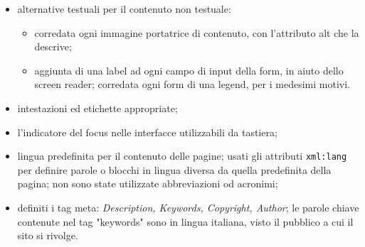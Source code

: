 {{\begin{itemize}
\begin{itemize}
\begin{itemize}
					\item Inseriti elementi \textit{th} per le intestazioni e riservati \textit{td} per i soli dati.
					\item Utilizzato l'attributo \textbf{scope} per rendere esplicita la relazione tra le celle d'intestazione e le celle di dati: indicando l’estensione di celle per cui l’intestazione si trova nella cella marcata con l’attributo \textbf{scope}. \\
					Abbiamo marcanto \textbf{scope} con il valore \textit{col} le celle d'intestazione, assicurando che le informazioni di intestazione si applichino a tutte le celle della colonna; col valore \textit{colspan}, invece, le celle d'intestazione relative ad un gruppo di colonne.
					\item Utilizzato serie di \textbf{id} e di \textbf{headers}: il primo per identificare una cella che contiene informazioni di intestazione a cui fare riferimento con headers serve per risalire alle celle d’intestazione da porre in relazione con la cella corrente. \\
					Questo per aumentare la comprensione dei contenuti, diminuire il disorientamento ed agevolare l'utente che fa uso di screen reader, visto che questi ultimi che tengono traccia delle intestazioni.
				\end{itemize}
			\item alternative testuali per il contenuto non testuale:
				\begin{itemize} \itemsep0.5pt
					\item corredata ogni immagine portatrice di contenuto, con l'attributo alt che la descrive;
					\item aggiunta di una label ad ogni campo di input della form, in aiuto dello screen reader; corredata ogni form di una legend, per i medesimi motivi.
				\end{itemize}
			\item intestazioni ed etichette appropriate; 
			\item l'indicatore del focus nelle interfacce utilizzabili da tastiera; 
			\item lingua predefinita per il contenuto delle pagine; usati gli attributi \texttt{xml:lang} per definire parole o blocchi in lingua diversa da quella predefinita della pagina; non sono state utilizzate abbreviazioni od acronimi;
 			\item definiti i tag meta: \textit{Description, Keywords, Copyright, Author}; le parole chiave contenute nel tag "keywords" sono in lingua italiana, visto il pubblico a cui il sito si rivolge.

\end{itemize}
\end{itemize}}}
